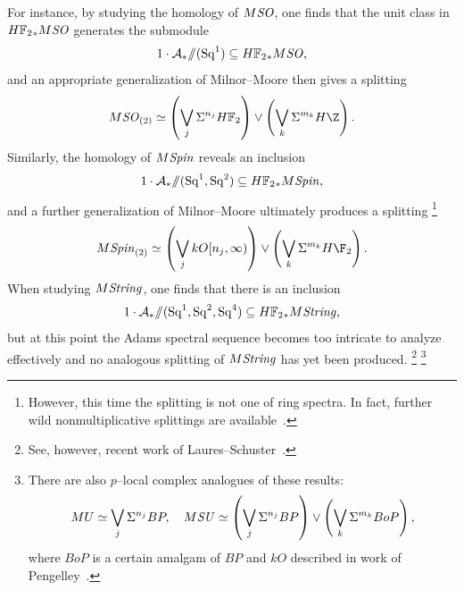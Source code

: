 For instance, by studying the homology of \(M\mathit{SO}\), one finds that the unit class in \(\HFtwo_* M\SO\) generates the submodule~\cite[Lemma 20.38]{Switzer} \[1 \cdot \mathcal A_* \mmod (\Sq^1) \subseteq \HFtwo_* M\SO,\] and an appropriate generalization of Milnor--Moore then gives a splitting \[M\SO_{(2)} \simeq \left( \bigvee_j \Susp^{n_j} \HFtwo \right) \vee \left( \bigvee_k \Susp^{m_k} H\Z \right).\]
Similarly, the homology of \(M\mathit{Spin}\) reveals an inclusion~\cite{ABS,ABP,GiambalvoPengelley} \[1 \cdot \mathcal A_* \mmod (\Sq^1, \Sq^2) \subseteq \HFtwo_* M\Spin,\] and a further generalization of Milnor--Moore ultimately produces a splitting%
\footnote{%
However, this time the splitting is not one of ring spectra.
In fact, further wild nonmultiplicative splittings are available~\cite{BordismSplitting}.
}
\[M\Spin_{(2)} \simeq \left( \bigvee_j kO[n_j, \infty)\right) \vee \left( \bigvee_k \Susp^{m_k} H\F_2 \right).\]
When studying \(M\mathit{String}\), one finds that there is an inclusion \[1 \cdot \mathcal A_* \mmod (\Sq^1, \Sq^2, \Sq^4) \subseteq \HFtwo_* M\String,\] but at this point the Adams spectral sequence becomes too intricate to analyze effectively and no analogous splitting of \(M\mathit{String}\) has yet been produced.%
\footnote{%
See, however, recent work of Laures--Schuster~\cite[Section 2]{LauresSchuster}.
}%
\footnote{%
There are also \(p\)--local complex analogues of these results:
\[
MU \simeq \bigvee_j \Sigma^{n_j} BP, \quad
M\mathit{SU} \simeq \left(\bigvee_j \Sigma^{n_j} BP\right) \vee \left(\bigvee_k \Sigma^{m_k} BoP \right),
\]
where \(BoP\) is a certain amalgam of \(BP\) and \(kO\) described in work of Pengelley~\cite{Pengelley}.
}

